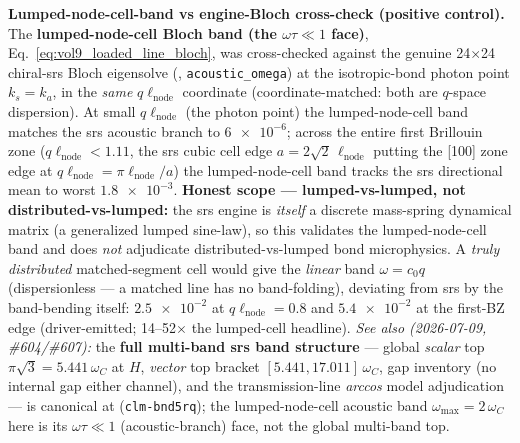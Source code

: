 \medskip\noindent\textbf{Lumped-node-cell-band vs engine-Bloch cross-check (positive control).} The \textbf{lumped-node-cell Bloch band (the $\omega\tau\ll1$ face)}, Eq.~\ref{eq:vol9_loaded_line_bloch}, was cross-checked against the genuine 24$\times$24 chiral-srs Bloch eigensolve (, \texttt{acoustic\_omega}) at the isotropic-bond photon point $k_s=k_a$, in the \emph{same} $q\ell_{\mathrm{node}}$ coordinate (coordinate-matched: both are $q$-space dispersion). At small $q\ell_{\mathrm{node}}$ (the photon point) the lumped-node-cell band matches the srs acoustic branch to $\num{6e-6}$; across the entire first Brillouin zone ($q\ell_{\mathrm{node}}<1.11$, the srs cubic cell edge $a=2\sqrt2\,\ell_{\mathrm{node}}$ putting the [100] zone edge at $q\ell_{\mathrm{node}}=\pi\ell_{\mathrm{node}}/a$) the lumped-node-cell band tracks the srs directional mean to worst $\num{1.8e-3}$. \textbf{Honest scope --- lumped-vs-lumped, not distributed-vs-lumped:} the srs engine is \emph{itself} a discrete mass-spring dynamical matrix (a generalized lumped sine-law), so this validates the lumped-node-cell band and does \emph{not} adjudicate distributed-vs-lumped bond microphysics. A \emph{truly distributed} matched-segment cell would give the \emph{linear} band $\omega=c_0 q$ (dispersionless --- a matched line has no band-folding), deviating from srs by the band-bending itself: $\num{2.5e-2}$ at $q\ell_{\mathrm{node}}=0.8$ and $\num{5.4e-2}$ at the first-BZ edge (driver-emitted; 14--52$\times$ the lumped-cell headline). \emph{See also (2026-07-09, \#604/\#607):} the \textbf{full multi-band srs band structure} --- global \emph{scalar} top $\pi\sqrt3 = 5.441\,\omega_C$ at $H$, \emph{vector} top bracket $[5.441, 17.011]\,\omega_C$, gap inventory (no internal gap either channel), and the transmission-line \emph{arccos} model adjudication --- is canonical at  (\texttt{clm-bnd5rq}); the lumped-node-cell acoustic band $\omega_{\max}=2\,\omega_C$ here is its $\omega\tau\ll1$ (acoustic-branch) face, not the global multi-band top.

